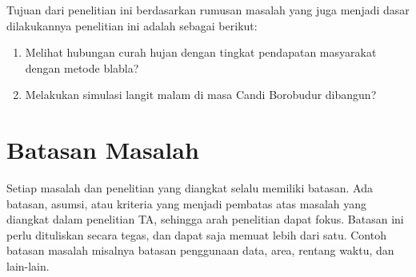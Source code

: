 \noindent Tujuan dari penelitian ini berdasarkan rumusan masalah yang juga menjadi dasar dilakukannya penelitian ini adalah sebagai berikut:
\begin{enumerate}
    \item Melihat hubungan curah hujan dengan tingkat pendapatan masyarakat dengan metode blabla?
    \item Melakukan simulasi langit malam di masa Candi Borobudur dibangun?
\end{enumerate}

\section{Batasan Masalah}
\noindent Setiap masalah dan penelitian yang diangkat selalu memiliki batasan. Ada batasan, asumsi, atau kriteria yang menjadi pembatas atas masalah yang diangkat dalam penelitian TA, sehingga arah penelitian dapat fokus. Batasan ini perlu dituliskan secara tegas, dan dapat saja memuat lebih dari satu. Contoh batasan masalah misalnya batasan penggunaan data, area, rentang waktu, dan lain-lain.

